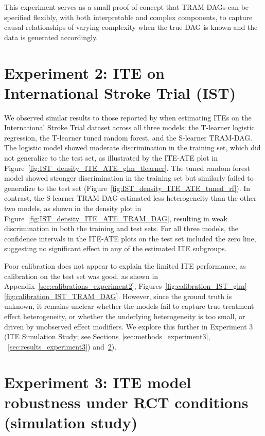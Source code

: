 This experiment serves as a small proof of concept that TRAM-DAGs can be specified flexibly, with both interpretable and complex components, to capture causal relationships of varying complexity when the true DAG is known and the data is generated accordingly.



\section{Experiment 2: ITE on International Stroke Trial (IST)}

We observed similar results to those reported by \citet{chen2025} when estimating ITEs on the International Stroke Trial dataset across all three models: the T-learner logistic regression, the T-learner tuned random forest, and the S-learner TRAM-DAG. The logistic model showed moderate discrimination in the training set, which did not generalize to the test set, as illustrated by the ITE-ATE plot in Figure~\ref{fig:IST_density_ITE_ATE_glm_tlearner}. The tuned random forest model showed stronger discrimination in the training set but similarly failed to generalize to the test set (Figure~\ref{fig:IST_density_ITE_ATE_tuned_rf}). In contrast, the S-learner TRAM-DAG estimated less heterogeneity than the other two models, as shown in the density plot in Figure~\ref{fig:IST_density_ITE_ATE_TRAM_DAG}, resulting in weak discrimination in both the training and test sets. For all three models, the confidence intervals in the ITE-ATE plots on the test set included the zero line, suggesting no significant effect in any of the estimated ITE subgroups.

Poor calibration does not appear to explain the limited ITE performance, as calibration on the test set was good, as shown in Appendix~\ref{sec:calibrations_experiment2}, Figures~\ref{fig:calibration_IST_glm}-\ref{fig:calibration_IST_TRAM_DAG}. However, since the ground truth is unknown, it remains unclear whether the models fail to capture true treatment effect heterogeneity, or whether the underlying heterogeneity is too small, or driven by unobserved effect modifiers. We explore this further in Experiment 3 (ITE Simulation Study; see Sections~\ref{sec:methods_experiment3}, ~\ref{sec:results_experiment3}) and~\ref{sec:disc_experiment3}).


\section{Experiment 3: ITE model robustness under RCT conditions (simulation study)} \label{sec:disc_experiment3}



